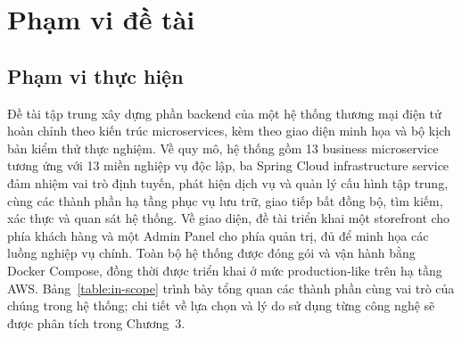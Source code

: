 \documentclass[../DoAn.tex]{subfiles}
\begin{document}



\section{Phạm vi đề tài}
\label{section:1.3}

\subsection*{Phạm vi thực hiện}

Đề tài tập trung xây dựng phần backend của một hệ thống thương mại điện tử hoàn chỉnh theo
kiến trúc microservices, kèm theo giao diện minh họa và bộ kịch bản kiểm thử thực nghiệm.
Về quy mô, hệ thống gồm 13 business microservice tương ứng với 13 miền nghiệp vụ độc lập, ba
Spring Cloud infrastructure service đảm nhiệm vai trò định tuyến, phát hiện dịch vụ và quản
lý cấu hình tập trung, cùng các thành phần hạ tầng phục vụ lưu trữ, giao tiếp bất đồng bộ,
tìm kiếm, xác thực và quan sát hệ thống. Về giao diện, đề tài triển khai một storefront cho
phía khách hàng và một Admin Panel cho phía quản trị, đủ để minh họa các luồng nghiệp vụ
chính. Toàn bộ hệ thống được đóng gói và vận hành bằng Docker Compose, đồng thời được triển
khai ở mức production-like trên hạ tầng AWS. Bảng~\ref{table:in-scope} trình bày tổng quan
các thành phần cùng vai trò của chúng trong hệ thống; chi tiết về lựa chọn và lý do sử dụng
từng công nghệ sẽ được phân tích trong Chương~3.
\end{document}
